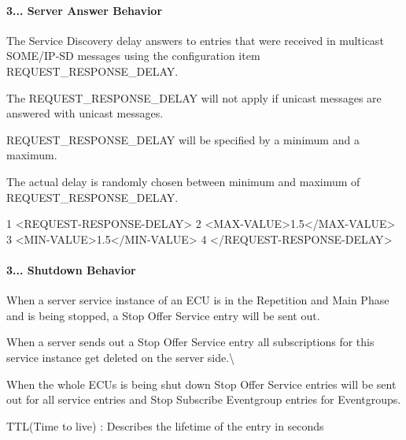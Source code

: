 \paragraph*{3... Server Answer Behavior}


\begin{DoxyItemize}
\item The Service Discovery delay answers to entries that were received in multicast S\+O\+M\+E/\+I\+P-\/\+SD messages using the configuration item R\+E\+Q\+U\+E\+S\+T\+\_\+\+R\+E\+S\+P\+O\+N\+S\+E\+\_\+\+D\+E\+L\+AY.
\item The R\+E\+Q\+U\+E\+S\+T\+\_\+\+R\+E\+S\+P\+O\+N\+S\+E\+\_\+\+D\+E\+L\+AY will not apply if unicast messages are answered with unicast messages.
\item R\+E\+Q\+U\+E\+S\+T\+\_\+\+R\+E\+S\+P\+O\+N\+S\+E\+\_\+\+D\+E\+L\+AY will be specified by a minimum and a maximum.
\item The actual delay is randomly chosen between minimum and maximum of R\+E\+Q\+U\+E\+S\+T\+\_\+\+R\+E\+S\+P\+O\+N\+S\+E\+\_\+\+D\+E\+L\+AY. 
\begin{DoxyCode}
1 <\textcolor{keywordtype}{REQUEST-RESPONSE-DELAY}>
2   <\textcolor{keywordtype}{MAX-VALUE}>1.5</\textcolor{keywordtype}{MAX-VALUE}>
3   <\textcolor{keywordtype}{MIN-VALUE}>1.5</\textcolor{keywordtype}{MIN-VALUE}>
4 </\textcolor{keywordtype}{REQUEST-RESPONSE-DELAY}>
\end{DoxyCode}

\end{DoxyItemize}

\paragraph*{3... Shutdown Behavior}


\begin{DoxyItemize}
\item When a server service instance of an E\+CU is in the Repetition and Main Phase and is being stopped, a Stop Offer Service entry will be sent out.
\item When a server sends out a Stop Offer Service entry all subscriptions for this service instance get deleted on the server side.\textbackslash{}
\item When the whole E\+C\+Us is being shut down Stop Offer Service entries will be sent out for all service entries and Stop Subscribe Eventgroup entries for Eventgroups.
\item T\+T\+L(\+Time to live) \+: Describes the lifetime of the entry in seconds
\end{DoxyItemize}



